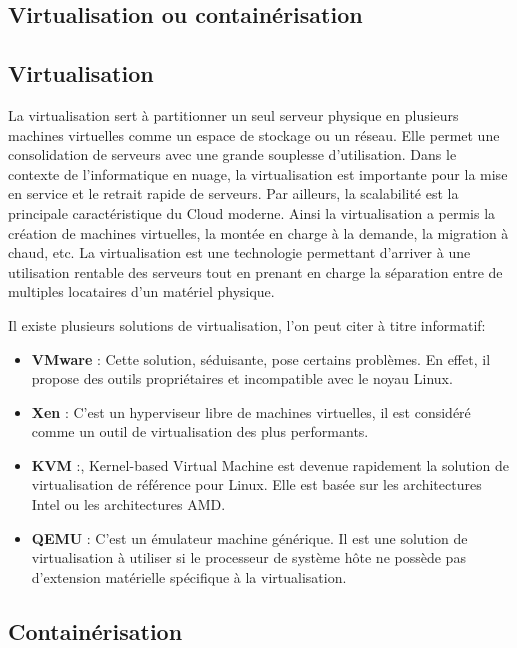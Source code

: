 \begin{onehalfspace}
\section{Virtualisation ou containérisation}

\subsection{Virtualisation}

La virtualisation sert à partitionner un seul serveur physique en plusieurs machines virtuelles comme un espace de stockage ou un réseau. Elle permet une consolidation de serveurs avec une grande souplesse d'utilisation. Dans le contexte de l'informatique en nuage, la virtualisation est importante pour la mise en service et le retrait rapide de serveurs. Par ailleurs, la scalabilité est la principale caractéristique du Cloud moderne. Ainsi la virtualisation a permis la création de machines virtuelles, la montée en charge à la demande, la migration à chaud, etc. La virtualisation est une technologie permettant d'arriver à une utilisation rentable des serveurs tout en prenant en charge la séparation entre de multiples locataires d'un matériel physique.

Il existe plusieurs solutions de virtualisation, l'on peut citer à titre informatif:

\begin{itemize}
\item \textbf{VMware} : Cette solution, séduisante, pose certains problèmes. En effet, il propose des outils propriétaires et incompatible avec le noyau Linux.
\item \textbf{Xen} : C'est un hyperviseur libre de machines virtuelles, il est considéré comme un outil de virtualisation des plus performants.
\item \textbf{KVM} :, Kernel-based Virtual Machine est devenue rapidement la solution de virtualisation de référence pour Linux. Elle est basée sur les architectures Intel ou les architectures AMD.
\item \textbf{QEMU} : C'est un émulateur machine générique. Il est une solution de virtualisation à utiliser si le processeur de système hôte ne possède pas d'extension matérielle spécifique à la virtualisation.

\end{itemize}

\subsection{Containérisation}


\end{onehalfspace}
